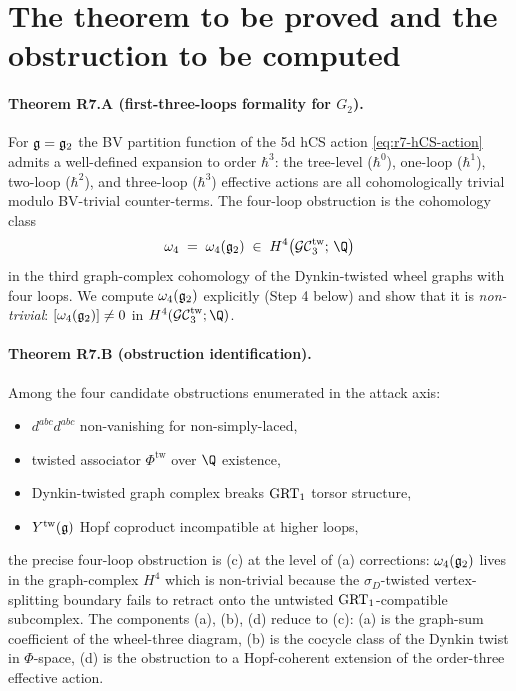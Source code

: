 \section*{The theorem to be proved and the obstruction to be computed}

\paragraph{Theorem R7.A (first-three-loops formality for $G_2$).}
For $\mathfrak{g} = \mathfrak{g}_2$ the BV partition function of the 5d hCS action
\eqref{eq:r7-hCS-action} admits a well-defined expansion to order $\hbar^3$:
the tree-level ($\hbar^0$), one-loop ($\hbar^1$), two-loop ($\hbar^2$),
and three-loop ($\hbar^3$) effective actions are all cohomologically
trivial modulo BV-trivial counter-terms. The four-loop obstruction is
the cohomology class
\begin{equation}
\label{eq:r7-obstruction-class}
 \omega_4 \;=\; \omega_4(\gtwo) \;\in\; H^4\bigl(\GCtw_3;\, \Q\bigr)
\end{equation}
in the third graph-complex cohomology of the Dynkin-twisted wheel graphs
with four loops. We compute $\omega_4(\mathfrak{g}_2)$ explicitly (Step 4 below)
and show that it is \emph{non-trivial}: $[\omega_4(\mathfrak{g}_2)] \ne 0$ in
$H^4(\GCtw_3; \Q)$.

\paragraph{Theorem R7.B (obstruction identification).}
Among the four candidate obstructions enumerated in the attack axis:
\begin{itemize}
\item[(a)] $d^{abc} d^{abc}$ non-vanishing for non-simply-laced,
\item[(b)] twisted associator $\Phi^{\mathrm{tw}}$ over $\Q$ existence,
\item[(c)] Dynkin-twisted graph complex breaks $\mathrm{GRT}_1$ torsor structure,
\item[(d)] $Y^{\mathrm{tw}}(\mathfrak{g})$ Hopf coproduct incompatible at higher loops,
\end{itemize}
the precise four-loop obstruction is (c) at the level of (a) corrections:
$\omega_4(\mathfrak{g}_2)$ lives in the graph-complex $H^4$ which is
non-trivial because the $\sigma_D$-twisted vertex-splitting boundary fails
to retract onto the untwisted $\mathrm{GRT}_1$-compatible subcomplex.
The components (a), (b), (d) reduce to (c): (a) is the graph-sum
coefficient of the wheel-three diagram, (b) is the cocycle class of
the Dynkin twist in $\Phi$-space, (d) is the obstruction to a
Hopf-coherent extension of the order-three effective action.

